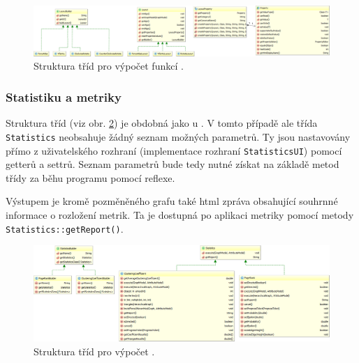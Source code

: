 \documentclass[thesis=M,czech]{FITthesis}[2014/05/6]
\begin{document}
\begin{figure}\centering
 	\includegraphics[width=1\textwidth]{images/class-diagram/layout}
 	\caption[Struktura tříd pro výpočet funkcí ]{Struktura tříd pro výpočet funkcí .}\label{fig:uml-layout}
\end{figure}



\subsubsection{Statistiku a metriky}
Struktura tříd (viz obr. \ref{fig:uml-statistics}) je obdobná jako u . V tomto případě ale třída \texttt{Statistics} neobsahuje 
žádný seznam možných parametrů. Ty jsou nastavovány přímo z uživatelského rozhraní (implementace rozhraní \texttt{StatisticsUI}) pomocí getterů a settrů.
Seznam parametrů bude tedy nutné získat na základě metod třídy za běhu programu pomocí reflexe.

Výstupem  je kromě pozměněného grafu také html zpráva obsahující souhrnné informace o rozložení metrik. Ta je dostupná po
aplikaci metriky pomocí metody \texttt{Statistics::getReport()}.

\begin{figure}\centering
 	\includegraphics[width=1\textwidth]{images/class-diagram/statistics}
 	\caption[Struktura tříd pro výpočet ]{Struktura tříd pro výpočet .}\label{fig:uml-statistics}
\end{figure}


\end{document}
